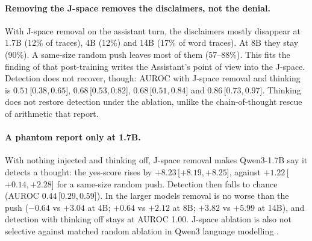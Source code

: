 \documentclass[11pt]{article}
\newcommand{\ci}[3]{\ensuremath{#1}\,[\ensuremath{#2},\allowbreak\,\ensuremath{#3}]}
\newcommand{\ys}{yes-score}
\begin{document}
\paragraph{Removing the J-space removes the disclaimers, not the denial.} With J-space removal on the assistant turn, the disclaimers mostly disappear at 1.7B (12\% of traces), 4B (12\%) and 14B (17\% of word traces). At 8B they stay (90\%). A same-size random push leaves most of them (57--88\%). This fits the finding of \citet{gurnee2026workspace} that post-training writes the Assistant's point of view into the J-space. Detection does not recover, though: AUROC with J-space removal and thinking is \ci{0.51}{0.38}{0.65}, \ci{0.68}{0.53}{0.82}, \ci{0.68}{0.51}{0.84} and \ci{0.86}{0.73}{0.97}. Thinking does not restore detection under the ablation, unlike the chain-of-thought rescue of arithmetic that \citet{gurnee2026workspace} report.

\paragraph{A phantom report only at 1.7B.} With nothing injected and thinking off, J-space removal makes Qwen3-1.7B say it detects a thought: the \ys{} rises by \ci{+8.23}{+8.19}{+8.25}, against \ci{+1.22}{+0.14}{+2.28} for a same-size random push. Detection then falls to chance (AUROC \ci{0.44}{0.29}{0.59}). In the larger models removal is no worse than the push ($-0.64$ vs $+3.04$ at 4B; $+0.64$ vs $+2.12$ at 8B; $+3.82$ vs $+5.99$ at 14B), and detection with thinking off stays at AUROC 1.00. J-space ablation is also not selective against matched random ablation in Qwen3 language modelling \citep{flo2026worse}.
\end{document}
